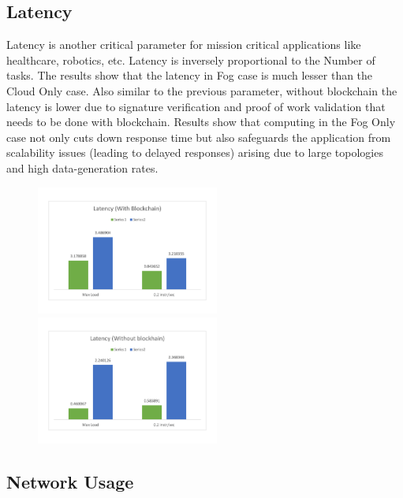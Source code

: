 \documentclass[10pt,journal,compsoc]{IEEEtran}
\begin{document}
\subsection{Latency}

Latency is another critical parameter for mission critical applications like healthcare, robotics, etc. Latency is inversely proportional to the Number of tasks. The results show that the latency in Fog case is much lesser than the Cloud Only case. Also similar to the previous parameter, without blockchain the latency is lower due to signature verification and proof of work validation that needs to be done with blockchain. Results show that computing in the Fog Only case not only cuts down response time but also safeguards the application from scalability issues (leading to delayed responses) arising due to large topologies and high data-generation rates.
\begin{figure}[h]
\centering
\includegraphics[width=6cm]{g71} \ \ \ \ \ \ \ \ \ \ \       
\includegraphics[width=6cm]{g72}
\end{figure}

\subsection{Network Usage}
\end{document}
